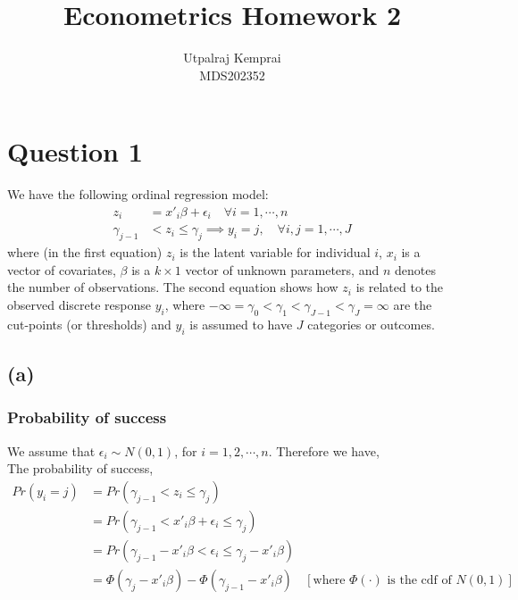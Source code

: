 \documentclass[a4paper]{article}
\begin{document}
\title{\huge Econometrics Homework 2}
\author{\LARGE Utpalraj Kemprai \\[5pt]
\LARGE MDS202352}
\date{}

\begin{titlingpage}
    \maketitle
\end{titlingpage}

\newpage

\section*{Question 1}

We have the following ordinal regression model:
\begin{align*}
    z_{i} &= x'_{i}\beta + \epsilon_{i} \quad \forall i = 1,\cdots,n \\
    \gamma_{j-1} &< z_{i} \leq \gamma_{j} \implies y_{i} = j, \quad \forall i, j = 1, \cdots, J
\end{align*}
where (in the first equation) $z_i$ is the latent variable for individual $i$, $x_i$ is a  vector of covariates,
$\beta$ is a $k\times1$ vector of unknown parameters, and $n$ denotes the number of observations. The second equation shows how $z_i$ is related to the observed discrete response $y_i$, where $-\infty = \gamma_0 < \gamma_1 <
\gamma_{J-1} < \gamma_J = \infty$ are the cut-points (or thresholds) and $y_i$ is assumed to have $J$ categories or outcomes.

\subsection*{(a)}

\subsubsection*{Probability of success}

We assume that $\epsilon_i \sim N(0,1)$, for $i = 1,2,\cdots, n$. Therefore we have,\\
The probability of success,
\begin{align*}
    Pr(y_i = j) &= Pr(\gamma_{j-1} < z_{i} \leq \gamma_j)\\
                &= Pr(\gamma_{j-1} < x'_{i}\beta + \epsilon_{i} \leq \gamma_j) \\
                &= Pr(\gamma_{j-1} - x'_{i}\beta < \epsilon_{i} \leq \gamma_j - x'_{i}\beta)\\
                &= \Phi(\gamma_j - x'_{i}\beta) - \Phi(\gamma_{j-1} - x'_{i}\beta) &[\text{where } \Phi(\cdot) \text{ is the cdf of }N(0,1) ]
\end{align*}
\end{document}

